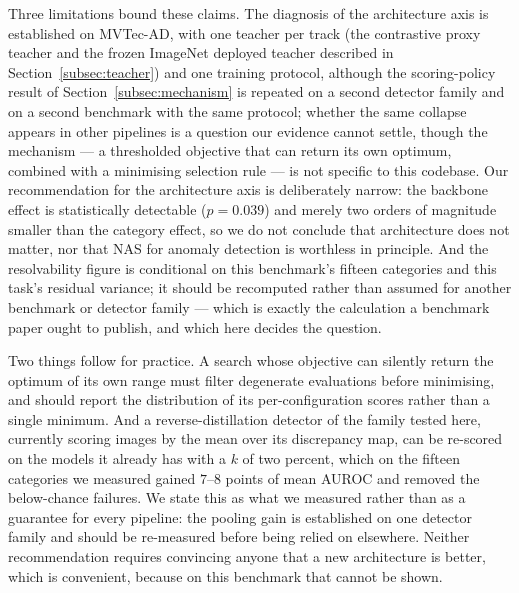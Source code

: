 Three limitations bound these claims. The diagnosis of the architecture axis is
established on MVTec-AD, with one teacher per track (the contrastive proxy teacher
and the frozen ImageNet deployed teacher described in
Section~\ref{subsec:teacher}) and one training protocol, although the
scoring-policy result of Section~\ref{subsec:mechanism} is repeated on a second
detector family and on a second benchmark with the same protocol; whether the same collapse appears in
other pipelines is a question our evidence cannot settle,
though the mechanism --- a thresholded objective that can return its own optimum,
combined with a minimising selection rule --- is not specific to this codebase.
Our recommendation for the architecture axis is deliberately narrow: the backbone
effect is statistically detectable ($p = 0.039$) and merely two orders of
magnitude smaller than the category effect, so we do not conclude that
architecture does not matter, nor that NAS for anomaly detection is worthless in
principle. And the resolvability figure is conditional on this benchmark's fifteen
categories and this task's residual variance; it should be recomputed rather than
assumed for another benchmark or detector family --- which is exactly the
calculation a benchmark paper ought to publish, and which here decides the
question.

Two things follow for practice. A search whose objective can silently return the
optimum of its own range must filter degenerate evaluations before minimising, and
should report the distribution of its per-configuration scores rather than a
single minimum. And a reverse-distillation detector of the family tested here,
currently scoring images by the mean over its discrepancy map, can be re-scored on
the models it already has with a $k$ of two percent, which on the fifteen
categories we measured gained $7$--$8$ points of mean AUROC and removed the
below-chance failures. We state this as what we measured rather than as a
guarantee for every pipeline: the pooling gain is established on one detector
family and should be re-measured before being relied on elsewhere. Neither
recommendation requires convincing anyone that a new architecture is better,
which is convenient, because on this benchmark that cannot be shown.
